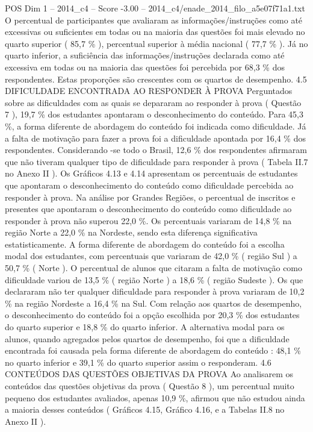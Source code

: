 \begin{textsample}{POS Dim 1 – 2014\_c4 – Score -3.00 – 2014\_c4/enade\_2014\_filo\_a5e07f71a1.txt}
O percentual de participantes que avaliaram as informações/instruções como até excessivas ou suficientes em todas ou na maioria das questões foi mais elevado no quarto superior ( 85,7 \% ), percentual superior à média nacional ( 77,7 \% ).
Já no quarto inferior, a suficiência das informações/instruções declarada como até excessiva em todas ou na maioria das questões foi percebida por 68,3 \% dos respondentes.
Estas proporções são crescentes com os quartos de desempenho. 4.5 DIFICULDADE ENCONTRADA AO RESPONDER À PROVA Perguntados sobre as dificuldades com as quais se depararam ao responder à prova ( Questão 7 ), 19,7 \% dos estudantes apontaram o desconhecimento do conteúdo.
Para 45,3 \%, a forma diferente de abordagem do conteúdo foi indicada como dificuldade.
Já a falta de motivação para fazer a prova foi a dificuldade apontada por 16,4 \% dos respondentes.
Considerando -se todo o Brasil, 12,6 \% dos respondentes afirmaram que não tiveram qualquer tipo de dificuldade para responder à prova ( Tabela II.7 no Anexo II ).
Os Gráficos 4.13 e 4.14 apresentam os percentuais de estudantes que apontaram o desconhecimento do conteúdo como dificuldade percebida ao responder à prova.
Na análise por Grandes Regiões, o percentual de inscritos e presentes que apontaram o desconhecimento do conteúdo como dificuldade ao responder à prova não superou 22,0 \%.
Os percentuais variaram de 14,8 \% na região Norte a 22,0 \% na Nordeste, sendo esta diferença significativa estatisticamente.
A forma diferente de abordagem do conteúdo foi a escolha modal dos estudantes, com percentuais que variaram de 42,0 \% ( região Sul ) a 50,7 \% ( Norte ).
O percentual de alunos que citaram a falta de motivação como dificuldade variou de 13,5 \% ( região Norte ) a 18,6 \% ( região Sudeste ).
Os que declararam não ter qualquer dificuldade para responder à prova variaram de 10,2 \% na região Nordeste a 16,4 \% na Sul.
Com relação aos quartos de desempenho, o desconhecimento do conteúdo foi a opção escolhida por 20,3 \% dos estudantes do quarto superior e 18,8 \% do quarto inferior.
A alternativa modal para os alunos, quando agregados pelos quartos de desempenho, foi que a dificuldade encontrada foi causada pela forma diferente de abordagem do conteúdo : 48,1 \% no quarto inferior e 39,1 \% do quarto superior assim o responderam. 4.6 CONTEÚDOS DAS QUESTÕES OBJETIVAS DA PROVA Ao analisarem os conteúdos das questões objetivas da prova ( Questão 8 ), um percentual muito pequeno dos estudantes avaliados, apenas 10,9 \%, afirmou que não estudou ainda a maioria desses conteúdos ( Gráficos 4.15, Gráfico 4.16, e a Tabelas II.8 no Anexo II ).

\end{textsample}
